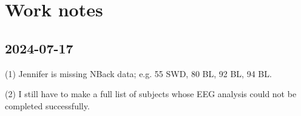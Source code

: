 \documentclass[a4paper, 12pt]{article}
\begin{document}
    
\section{Work notes} 

\subsection{2024-07-17}

(1) Jennifer is missing NBack data; e.g. 55 SWD, 80 BL, 92 BL, 94 BL.

(2) I still have to make a full list of subjects whose EEG analysis could not
be completed successfully.
\end{document}
